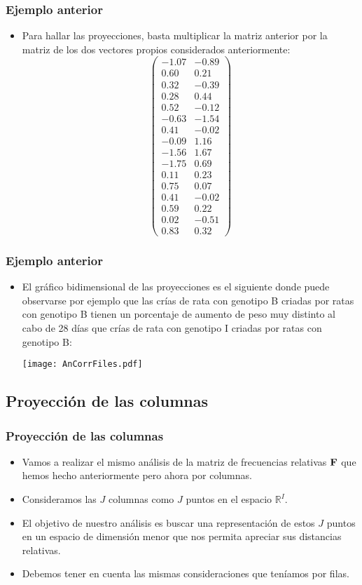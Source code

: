 \begin{frame}
\frametitle{Ejemplo anterior}
\begin{itemize}
\item<2->{Para hallar las proyecciones, basta multiplicar la matriz anterior por la matriz de los dos vectores propios considerados anteriormente:
{\tiny $$
\begin{pmatrix}
-1.07 & -0.89 \\
0.60 & 0.21 \\
0.32 & -0.39 \\
0.28 & 0.44 \\
0.52 & -0.12 \\
-0.63 & -1.54 \\
0.41 & -0.02 \\
-0.09 & 1.16 \\
-1.56 & 1.67 \\
-1.75 & 0.69 \\
0.11 & 0.23 \\
0.75 & 0.07 \\
0.41 & -0.02 \\
0.59 & 0.22 \\
0.02 & -0.51 \\
0.83 & 0.32 
\end{pmatrix}
$$}}
\end{itemize}
\end{frame}
\begin{frame}
\frametitle{Ejemplo anterior}
\begin{itemize}
\item<2->{El gráfico bidimensional de las proyecciones es el siguiente donde puede observarse por ejemplo que las crías de rata con genotipo B criadas por ratas con genotipo B tienen un porcentaje de aumento de peso muy distinto al cabo de 28 días que crías de rata con genotipo I criadas por ratas con genotipo B:
\begin{center}
\texttt{[image: AnCorrFiles.pdf]}
\end{center}
}
\end{itemize}
\end{frame}
\subsection{Proyección de las columnas}
\begin{frame}
\frametitle{Proyección de las columnas}
\begin{itemize}
\item<2->{Vamos a realizar el mismo análisis de la matriz de frecuencias relativas $\mathbf{F}$ que hemos hecho anteriormente pero ahora por columnas.}
\item<3->{Consideramos las $J$ columnas como $J$ puntos en el espacio $\mathbb{R}^I$.}
\item<4->{El objetivo de nuestro análisis es buscar una representación de estos $J$ puntos en un espacio de dimensión menor que nos permita apreciar sus distancias relativas.}
\item<5->{Debemos tener en cuenta las mismas consideraciones que teníamos por filas.}
\end{itemize}
\end{frame}


